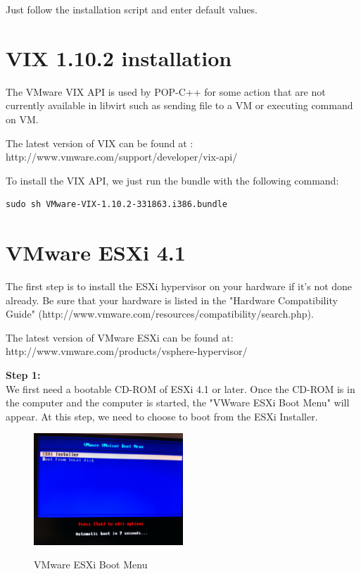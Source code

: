 Just follow the installation script and enter default values. 




\pagebreak
\section{VIX 1.10.2 installation}
\label{app:vix}
The VMware VIX API is used by POP-C++ for some action that are not currently available in libvirt such as sending file to a VM or executing command on VM.\s

The latest version of VIX can be found at : http://www.vmware.com/support/developer/vix-api/

To install the VIX API, we just run the bundle with the following command: \s

\begin{lstlisting}
sudo sh VMware-VIX-1.10.2-331863.i386.bundle
\end{lstlisting}



\section{VMware ESXi 4.1}
\label{app:esxi}
The first step is to install the ESXi hypervisor on your hardware if it's not done already. Be sure that your hardware is listed in the "Hardware Compatibility Guide" (http://www.vmware.com/resources/compatibility/search.php). \s

The latest version of VMware ESXi can be found at: http://www.vmware.com/products/vsphere-hypervisor/

\textbf{Step 1:}\\
We first need a bootable CD-ROM of ESXi 4.1 or later. Once the CD-ROM is in the computer and the computer is started, the "VWware ESXi Boot Menu" will appear. At this step, we need to choose to boot from the ESXi Installer. 

\begin{figure}[ht]
	\caption{VMware ESXi Boot Menu}
  	\centering
	\includegraphics[width=0.5\textwidth]{./pic/esxi_1.jpg}
	\label{fig:kex_object_creation}
\end{figure}


